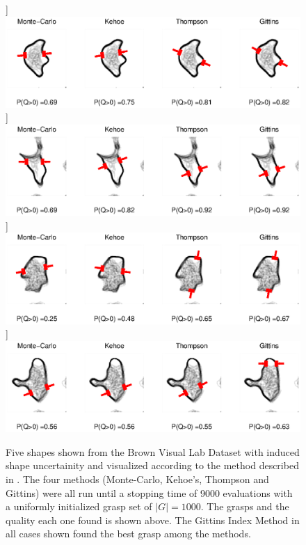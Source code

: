 \documentclass[journal,transmag]{IEEEtran}%
\begin{document}
\begin{figure}%
    \centering
    \qquad
    \subfloat]{{\includegraphics[width=16.5cm]{matlab_figures/shapes_2.eps} }}%
       \subfloat]{{\includegraphics[width=16.5cm]{matlab_figures/shapes_3.eps} }}%
          \subfloat]{{\includegraphics[width=16.5cm]{matlab_figures/shapes_4.eps} }}%
             \subfloat]{{\includegraphics[width=16.5cm]{matlab_figures/shapes_5.eps} }}%
    
    \caption{Five shapes shown from the Brown Visual Lab Dataset with induced shape uncertainity and visualized according to the method described in \cite{mahler2015gp}. The four methods (Monte-Carlo, Kehoe's, Thompson and Gittins) were all run until a stopping time of 9000 evaluations with a uniformly initialized grasp set of $|G|=1000$. The grasps and the quality each one found is shown above. The Gittins Index Method in all cases shown found the best grasp among the methods.  }%
    \label{fig:rot_shapes}%
\end{figure}
\end{document}
